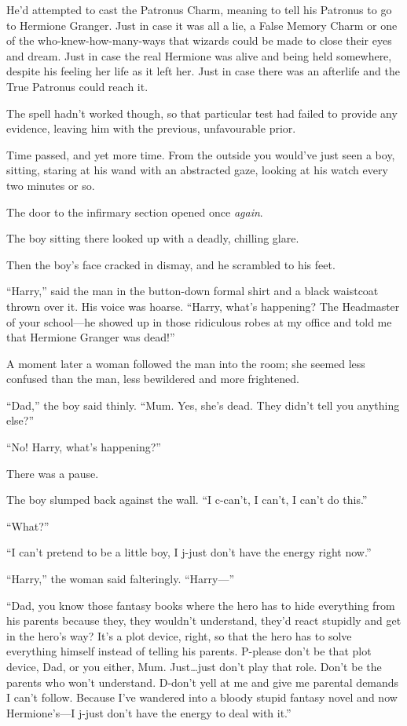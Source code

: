 He’d attempted to cast the Patronus Charm, meaning to tell his Patronus to go to Hermione Granger. Just in case it was all a lie, a False Memory Charm or one of the who-knew-how-many-ways that wizards could be made to close their eyes and dream. Just in case the real Hermione was alive and being held somewhere, despite his feeling her life as it left her. Just in case there was an afterlife and the True Patronus could reach it.

The spell hadn’t worked though, so that particular test had failed to provide any evidence, leaving him with the previous, unfavourable prior.

Time passed, and yet more time. From the outside you would’ve just seen a boy, sitting, staring at his wand with an abstracted gaze, looking at his watch every two minutes or so.

The door to the infirmary section opened once \emph{again}.

The boy sitting there looked up with a deadly, chilling glare.

Then the boy’s face cracked in dismay, and he scrambled to his feet.

“Harry,” said the man in the button-down formal shirt and a black waistcoat thrown over it. His voice was hoarse. “Harry, what’s happening? The Headmaster of your school—he showed up in those ridiculous robes at my office and told me that Hermione Granger was dead!”

A moment later a woman followed the man into the room; she seemed less confused than the man, less bewildered and more frightened.

“Dad,” the boy said thinly. “Mum. Yes, she’s dead. They didn’t tell you anything else?”

“No! Harry, what’s happening?”

There was a pause.

The boy slumped back against the wall. “I c-can’t, I can’t, I can’t do this.”

“What?”

“I can’t pretend to be a little boy, I j-just don’t have the energy right now.”

“Harry,” the woman said falteringly. “Harry—”

“Dad, you know those fantasy books where the hero has to hide everything from his parents because they, they wouldn’t understand, they’d react stupidly and get in the hero’s way? It’s a plot device, right, so that the hero has to solve everything himself instead of telling his parents. P-please don’t be that plot device, Dad, or you either, Mum. Just…just don’t play that role. Don’t be the parents who won’t understand. D-don’t yell at me and give me parental demands I can’t follow. Because I’ve wandered into a bloody stupid fantasy novel and now Hermione’s—I j-just don’t have the energy to deal with it.”

